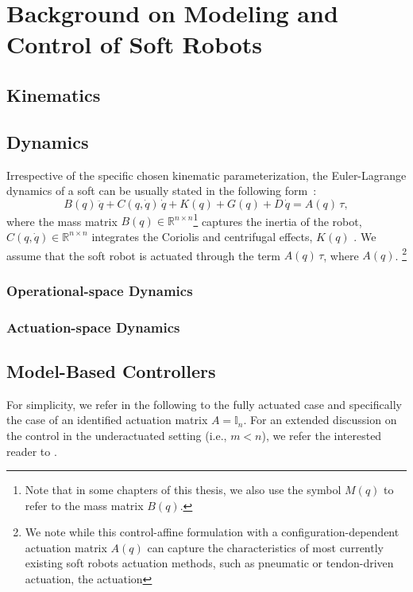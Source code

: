 \chapter{Background on Modeling and Control of Soft Robots}\label{chp:background}
\section{Kinematics}
\section{Dynamics}
Irrespective of the specific chosen kinematic parameterization, the Euler-Lagrange dynamics of a soft can be usually stated in the following form~\citep{della2023model}:
\begin{equation}
    B(q) \, \ddot{q} + C(q, \dot{q}) \, \dot{q} + K(q) + G(q) + D \, \dot{q} = A(q) \, \tau,
\end{equation}
where the mass matrix $B(q) \in \mathbb{R}^{n \times n}$\footnote{Note that in some chapters of this thesis, we also use the symbol $M(q)$ to refer to the mass matrix $B(q)$.} captures the inertia of the robot, $C(q,\dot{q}) \in \mathbb{R}^{n \times n}$ integrates the Coriolis and centrifugal effects, $K(q)$ .
We assume that the soft robot is actuated through the term $A(q) \, \tau$, where $A(q) $.
\footnote{We note while this control-affine formulation with a configuration-dependent actuation matrix $A(q)$ can capture the characteristics of most currently existing soft robots actuation methods, such as pneumatic or tendon-driven actuation, the actuation }




\subsection{Operational-space Dynamics}

\subsection{Actuation-space Dynamics}

\section{Model-Based Controllers}
For simplicity, we refer in the following to the fully actuated case and specifically the case of an identified actuation matrix $A = \mathbb{I}_n$.
For an extended discussion on the control in the underactuated setting (i.e., $m < n$), we refer the interested reader to \citet{pustina2025analysis}.